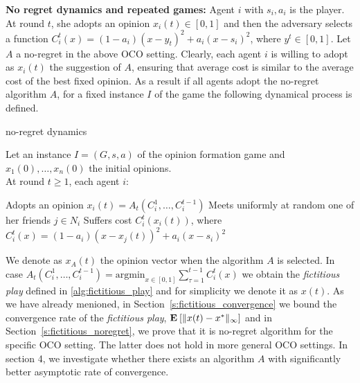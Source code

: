 \noindent \textbf{No regret dynamics and repeated games:}
\noindent Agent $i$ with $s_i,a_i$ is the player. At round $t$, she adopts an opinion $x_i(t) \in [0,1]$ and then the adversary selects a function $C_i^t(x)=(1-a_i)(x-y_t)^2 + a_i(x-s_i)^2$, where $y^t\in [0,1]$.
Let $A$ a no-regret in the above OCO setting. Clearly, each agent $i$ is willing to adopt as $x_i(t)$ the suggestion of $A$, ensuring that average cost is similar
to the average cost of the best fixed opinion. As a result if all agents adopt the no-regret algorithm $A$, for a fixed instance $I$ of the game the following dynamical process
is defined.
\begin{algorithm}
  \caption{no-regret dynamics}
  \label{alg:fno_regret_dynamics}
      Let an instance $I=(G,s,a)$ of the opinion formation game and $x_1(0),\ldots,x_n(0)$ the initial opinions.\\
      At round $t\geq 1$, each agent $i$:
  \begin{algorithmic}[1]
    \State Adopts an opinion $x_i(t)=A_t(C_i^1,\ldots,C_i^{t-1})$
    \State Meets uniformly at random one of her friends $j \in N_i$
    \State Suffers cost $C^t_i(x_i(t))$, where $C^t_i(x) = (1-a_i)(x-x_j(t))^2 + a_i(x-s_i)^2$
\end{algorithmic}
\end{algorithm}

\noindent We denote as $x_A(t)$ the opinion vector when the algorithm $A$ is selected. In case $A_t(C_i^1,\ldots,C_i^{t-1})= \text{argmin}_{x \in [0,1]}\sum_{\tau=1}^{t-1}C_i^t(x)$
we obtain the \emph{fictitious play} defined in \ref{alg:fictitious_play} and for simplicity we denote it as $x(t)$. As we have already menioned, in Section~\ref{s:fictitious_convergence} we
bound the convergence rate of the \emph{fictitious play}, $\Exp{\norm{\infty}{x(t)-x^*}}$ and in Section~\ref{s:fictitious_noregret}, we prove that it is no-regret algorithm for the specific OCO setting. The latter
does not hold in more general OCO settings. In section 4, we investigate whether there exists an algorithm $A$ with significantly better asymptotic rate of convergence.

